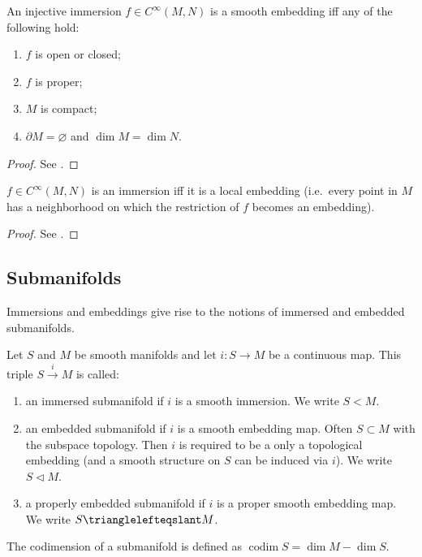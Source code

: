 \documentclass[english,letterpaper]{article}%
\numberwithin{equation}{section}
\numberwithin{figure}{section}
\numberwithin{table}{section}
\theoremstyle{definition}
\theoremstyle{definition}
\theoremstyle{definition}
\theoremstyle{plain}
\theoremstyle{plain}
\theoremstyle{plain}
\theoremstyle{plain}
\theoremstyle{remark}
\theoremstyle{remark}
\def\red{\color{red}}
\DeclareMathOperator{\codim}{codim}
\newcommand{\sub}{\vartriangleleft}
\newcommand{\sube}{\trianglelefteqslant}
\newcommand{\PRLsep}{   %
           \noindent\makebox[\linewidth]{
                \resizebox{0.5\linewidth}{1pt}{$\blacklozenge$}}}
\begin{document}
\begin{prop}
An injective immersion $f\in C^\infty (M,N)$ is a smooth embedding iff any of the following hold:
\begin{enumerate}
    \item $f$ is open or closed;
    \item $f$ is proper;
    \item $M$ is compact;
    \item $\partial M=\varnothing$ and $\dim M=\dim N$.
\end{enumerate}
\end{prop}
\begin{proof}
See \cite[Prop 4.22]{Lee}.
\end{proof}

\begin{thm}\label{thm.local embedding}
$f\in C^\infty (M,N)$ is an immersion iff it is a local embedding (i.e.\ every point in $M$ has a neighborhood on which the restriction of $f$ becomes an embedding). 
\end{thm}
\begin{proof}
See \cite[Thm 4.25]{Lee}.
\end{proof}

\subsection{Submanifolds}
Immersions and embeddings give rise to the notions of immersed and embedded submanifolds.

\begin{defn}
Let $S$ and $M$ be smooth manifolds and let $i:S\to M$ be a continuous map. This triple $S\overset{i}{\to}M$ is called:
\begin{enumerate}
    \item an immersed submanifold if $i$ is a smooth immersion. We write $S<M$.
    \item an embedded submanifold if $i$ is a smooth embedding map. Often $S\subset M$ with the subspace topology. Then $i$ is required to be a only a topological embedding (and a smooth structure on $S$ can be induced via $i$). We write $S\sub M$.
    \item a properly embedded submanifold if $i$ is a proper smooth embedding map. We write $S\sube M$.
\end{enumerate}
The codimension  of a submanifold is defined as $\codim S=\dim M -\dim S$.
\end{defn}
\end{document}
